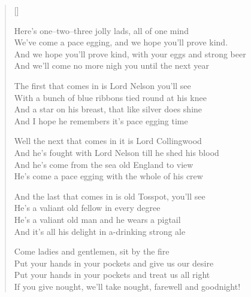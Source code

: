 \pagebreak
\settowidth{\versewidth}{With a bunch of blue ribbons tied round at his knee}
\begin{verse}[\versewidth]
\\
\begin{chorus}
Here's one--two--three jolly lads, all of one mind\\
We've come a pace egging, and we hope you'll prove kind.\\
And we hope you'll prove kind, with your eggs and strong beer\\
And we'll come no more nigh you until the next year
\end{chorus}

The first that comes in is Lord Nelson you'll see\\
With a bunch of blue ribbons tied round at his knee\\
And a star on his breast, that like silver does shine\\
And I hope he remembers it's pace egging time

Well the next that comes in it is Lord Collingwood\\
And he's fought with Lord Nelson till he shed his blood\\
And he's come from the sea old England to view\\
He's come a pace egging with the whole of his crew

And the last that comes in is old Tosspot, you'll see\\
He's a valiant old fellow in every degree\\
He's a valiant old man and he wears a pigtail\\
And it's all his delight in a-drinking strong ale

Come ladies and gentlemen, sit by the fire\\
Put your hands in your pockets and give us our desire\\
Put your hands in your pockets and treat us all right\\
If you give nought, we'll take nought, farewell and goodnight!

\end{verse}
